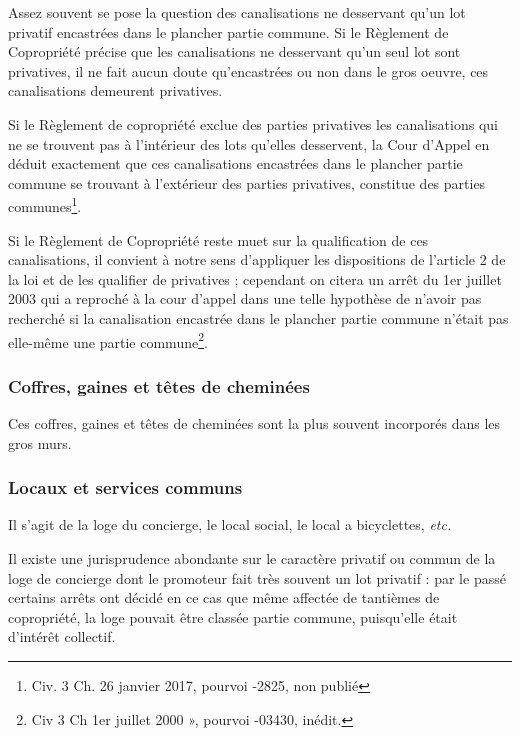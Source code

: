 		Assez souvent se pose la question des canalisations ne desservant qu’un lot privatif encastrées
		dans le plancher partie commune.
		Si le Règlement de Copropriété précise que les canalisations ne desservant qu’un seul lot sont
		privatives, il ne fait aucun doute qu’encastrées ou non dans le gros oeuvre, ces canalisations
		demeurent privatives.
		
		Si le Règlement de copropriété exclue des parties privatives les canalisations qui ne se trouvent pas
		à l'intérieur des lots qu'elles desservent, la Cour d’Appel en déduit exactement que ces canalisations
		encastrées dans le plancher partie commune se trouvant à l’extérieur des parties privatives, constitue
		des parties communes\footnote{Civ. 3\degre{} Ch. 26 janvier 2017, pourvoi -2825, non publié}.
		
		Si le Règlement de Copropriété reste muet sur la qualification de ces canalisations, il convient à
		notre sens d’appliquer les dispositions de l’article 2 de la loi et de les qualifier de privatives ;
		cependant on citera un arrêt du 1er juillet 2003 qui a reproché à la cour d’appel dans une telle
		hypothèse de n’avoir pas recherché si la canalisation encastrée dans le plancher partie commune
		n'était pas elle-même une partie commune\footnote{Civ 3\degre{} Ch 1er juillet 2000 », pourvoi -03430, inédit.}.
		
		\subsubsection{Coffres, gaines et têtes de cheminées}
		
		Ces coffres, gaines et têtes de cheminées sont la plus souvent incorporés dans les gros murs.
		
		\subsubsection{Locaux et services communs}
		
		Il s’agit de la loge du concierge, le local social, le local a bicyclettes, \emph{etc.}
		
		Il existe une jurisprudence abondante sur le caractère privatif ou commun de la loge de concierge dont le
		promoteur fait très souvent un lot privatif : par le passé certains arrêts ont décidé en ce cas que même
		affectée de tantièmes de copropriété, la loge pouvait être classée partie commune, puisqu’elle était
		d’intérêt collectif.
		
